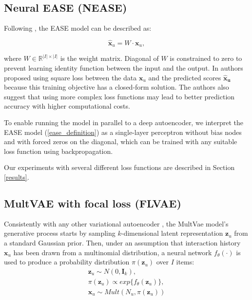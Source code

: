 \documentclass[conference]{IEEEtran}
\begin{document}
    \subsection{Neural EASE (NEASE)}
        
        Following \cite{Steck2019}, the EASE model can be described as:
        
            \begin{equation}\label{ease_definition} 
                \mathbf{\hat{x}}_u= W \cdot \mathbf{x}_u,
            \end{equation}
        
        where \(W\in \mathbb{R}^{|I|\times{|I|}}\) is the weight matrix. Diagonal of \(W\) is constrained to zero to prevent learning identity function between the input and the output. In \cite{Steck2019} authors proposed using square loss between the data \(\mathbf{x}_u\) and the predicted scores \(\mathbf{\hat{x}_u}\) because this training objective has a closed-form solution. The authors also suggest that using more complex loss functions may lead to better prediction accuracy with higher computational costs.
        
        To enable running the model in parallel to a deep autoencoder, we interpret the EASE model (\ref{ease_definition}) as a single-layer perceptron  without bias nodes and with forced zeros on the diagonal, which can be trained with any suitable loss function using backpropagation.
        
        Our experiments with several different loss functions are described in Section \ref{results}.
         
    \subsection{MultVAE with focal loss (FLVAE)}

        Consistently with any other variational autoencoder \cite{Kingma2014}, the MultVae model's generative process starts by sampling \(k\)-dimensional latent representation \(\mathbf{z}_u\) from a standard Gaussian prior\cite{Liang2018}. 
        Then, under an assumption that interaction history \(\mathbf{x}_u\) has been drawn from a multinomial distribution, a neural network \(f_\theta(\cdot)\) is used to produce a probability distribution \(\pi(\mathbf{z}_u)\) over \(I\) items:
            \begin{gather*}\label{z_drawn}
                \mathbf{z}_u\sim N(0,\mathbf{I}_k), \\
                \pi(\mathbf{z}_u) \propto exp\{f_\theta(\mathbf{z}_u)\}, \\
                \mathbf{x}_u\sim Mult(N_u,\pi(\mathbf{z}_u))
            \end{gather*}
\end{document}
